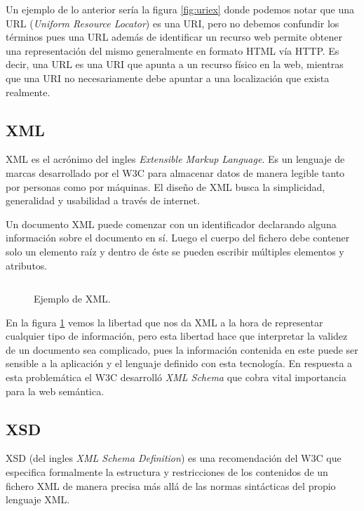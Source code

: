Un ejemplo de lo anterior sería la figura \ref{fig:uriex} donde podemos notar
que una URL (\emph{Uniform Resource Locator}) es una URI, pero no debemos
confundir los términos pues una URL además de identificar un recurso web permite
obtener una representación del mismo generalmente en formato HTML vía HTTP. Es
decir, una URL es una URI que apunta a un recurso físico en la web, mientras que
una URI no necesariamente debe apuntar a una localización que exista realmente.

\subsection{XML}
XML es el acrónimo del ingles \emph{Extensible Markup Language}. Es un
lenguaje de marcas desarrollado por el W3C para almacenar datos de manera
legible tanto por personas como por máquinas. 
El diseño de XML busca la simplicidad, generalidad y usabilidad a través de
internet\cite{paoli2004extensible}. 

Un documento XML puede comenzar con un identificador declarando alguna
información sobre el documento en sí. Luego el cuerpo del fichero debe contener
solo un elemento raíz y dentro de éste se pueden escribir múltiples elementos y
atributos.

\begin{figure}[htpb]
  \centering
  \begin{tabular}{c}
    
  \end{tabular}
  \caption{Ejemplo de XML.}
  \vspace{-.25cm}
  \label{fig:xmlex}
\end{figure}

En la figura \ref{fig:xmlex} vemos la libertad que nos da XML a la hora de
representar cualquier tipo de información, pero esta libertad hace que
interpretar la validez de un documento sea complicado, pues la información
contenida en este puede ser sensible a la aplicación y el lenguaje definido con
esta tecnología. En respuesta a esta problemática el W3C desarrolló \emph{XML
Schema} que cobra vital importancia para la web semántica.


\subsection{XSD}
XSD (del ingles \emph{XML Schema Definition}) es una recomendación del W3C que
especifica formalmente la estructura y restricciones de los contenidos de un
fichero XML de manera precisa más allá de las normas sintácticas del propio
lenguaje XML.

